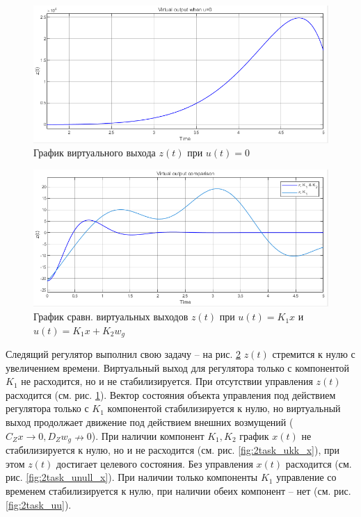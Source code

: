 \documentclass[a4paper, 12pt]{article}
\begin{document}
    \begin{figure}[H]
        \centering
        \includegraphics[scale=0.75]{2task_unull_z.png}
        \captionsetup{skip=0pt}
        \caption{График виртуального выхода $z(t)$ при $u(t)=0$}
        \label{fig:2task_unull_z}
    \end{figure}
    \begin{figure}[H]
        \centering
        \includegraphics[scale=0.75]{2task_zz.png}
        \captionsetup{skip=0pt}
        \caption{График сравн. виртуальных выходов $z(t)$ при $u(t)=K_1x$ и $u(t)=K_1x+K_2 w_g$}
        \label{fig:2task_zz}
    \end{figure}
    \noindent Следящий регулятор выполнил свою задачу -- на рис. \ref{fig:2task_zz}
    $z(t)$ стремится к нулю с увеличением времени. Виртуальный выход для регулятора только
    с компонентой $K_1$ не расходится, но и не стабилизируется. При отсутствии управления $z(t)$
    расходится (см. рис. \ref{fig:2task_unull_z}). Вектор состояния объекта управления под действием
    регулятора только с $K_1$ компонентой стабилизируется к нулю, но виртуальный выход продолжает
    движение под действием внешних возмущений ($C_Zx\rightarrow0,D_Z w_g\nrightarrow0$).
    При наличии компонент $K_1,K_2$ график $x(t)$ не стабилизируется к нулю, но и не расходится (см. рис. \ref{fig:2task_ukk_x}),
    при этом $z(t)$ достигает целевого состояния. Без управления $x(t)$ расходится (см. рис. \ref{fig:2task_unull_x}).
    При наличии только компоненты $K_1$ управление со временем стабилизируется к нулю, при наличии обеих компонент -- нет (см. рис. \ref{fig:2task_uu}).
\end{document}
